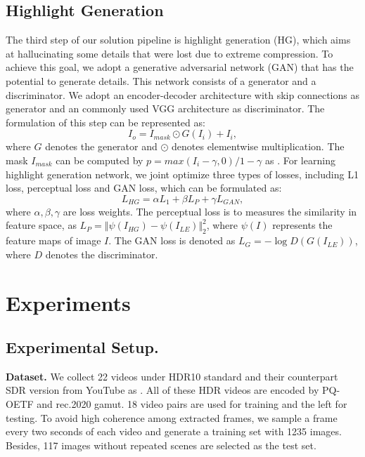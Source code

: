 \documentclass[10pt,twocolumn,letterpaper]{article}
\begin{document}
\subsection{Highlight Generation}
The third step of our solution pipeline is highlight generation (HG), which aims at hallucinating some details that were lost due to extreme compression. To achieve this goal, we adopt a generative adversarial network (GAN) \cite{goodfellow2014generative} that has the potential to generate details. This network consists of a generator and a discriminator. We adopt an encoder-decoder architecture with skip connections \cite{ronneberger2015u} as generator and an commonly used VGG architecture \cite{simonyan2014very} as discriminator. The formulation of this step can be represented as:
\begin{equation}
   I_{o}=I_{mask}\odot G(I_{i})+I_{i},
\end{equation}
where $G$ denotes the generator and $\odot $ denotes elementwise multiplication. The mask $I_{mask}$ can be computed by $p=max(I_{i}-\gamma,0)/1-\gamma$ as \cite{liu2020single}. For learning highlight generation network, we joint optimize three types of losses, including L1 loss, perceptual loss and GAN loss, which can be formulated as:
\begin{equation}
   L_{HG}=\alpha L_{1}+\beta L_{P}+\gamma L_{GAN},
\end{equation}
where $\alpha, \beta, \gamma$ are loss weights. The perceptual loss is to measures the similarity in feature space, as $L_{P}=\Vert \psi (I_{HG})-\psi (I_{LE}) \Vert_{2}^{2}$, where $\psi{(I)}$ represents the feature maps of image $I$. The GAN loss is denoted as $L_{G}=-\log D(G(I_{LE}))$, where $D$ denotes the discriminator.

\section{Experiments}
\label{Experiments}
\subsection{Experimental Setup.}
\textbf{Dataset.} We collect 22 videos under HDR10 standard and their counterpart SDR version from YouTube as \cite{kim2019deep}. All of these HDR videos are encoded by PQ-OETF and rec.2020 gamut. 18 video pairs are used for training and the left for testing. To avoid high coherence among extracted frames, we sample a frame every two seconds of each video and generate a training set with 1235 images. 
Besides, 117 images without repeated scenes are selected as the test set.
\end{document}
